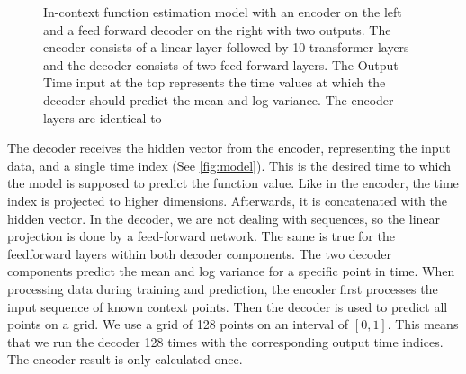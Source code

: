 \begin{figure}
	\centering
	\caption{In-context function estimation model with an encoder on the left and a feed forward decoder on the right with two outputs. The encoder consists of a linear layer followed by 10 transformer layers and the decoder consists of two feed forward layers. The Output Time input at the top represents the time values at which the decoder should predict the mean and log variance. The encoder layers are identical to \citet{vaswani2017attention}}
	\label{fig:model}
\end{figure}

The decoder receives the hidden vector from the encoder, representing the input data, and a single time index (See \autoref{fig:model}). This is the desired time to which the model is supposed to predict the function value. Like in the encoder, the time index is projected to higher dimensions. Afterwards, it is concatenated with the hidden vector. In the decoder, we are not dealing with sequences, so the linear projection is done by a feed-forward network. The same is true for the feedforward layers within both decoder components. The two decoder components predict the mean and log variance for a specific point in time. When processing data during training and prediction, the encoder first processes the input sequence of known context points. Then the decoder is used to predict all points on a grid. We use a grid of 128 points on an interval of $[0,1]$. This means that we run the decoder 128 times with the corresponding output time indices. The encoder result is only calculated once. 

